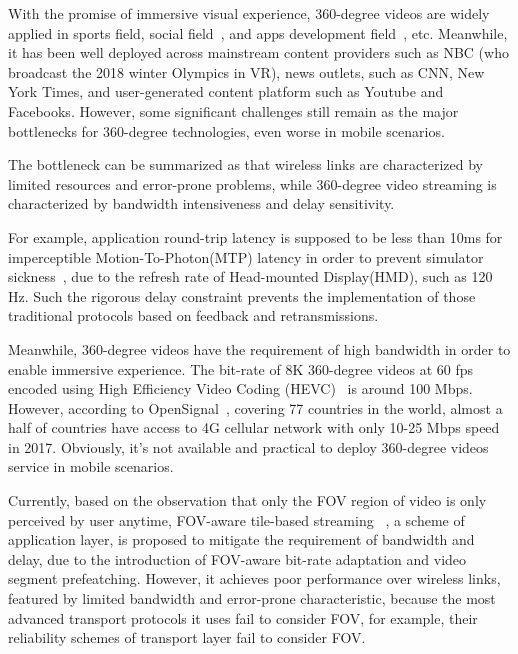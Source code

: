 With the promise of immersive visual experience, 360-degree videos are widely applied in sports field, social field~\cite{facebook360}, and apps development field~\cite{google_developers}, etc. Meanwhile, it has been well deployed across mainstream content providers such as NBC (who broadcast the 2018 winter Olympics in VR), news outlets, such as CNN, New York Times, and user-generated content platform such as Youtube and Facebooks.
However, some significant challenges still remain as the major bottlenecks for 360-degree technologies, even worse in mobile scenarios.

The bottleneck can be summarized as that wireless links are characterized by limited resources and error-prone problems, while 360-degree video streaming
is characterized by bandwidth intensiveness and delay sensitivity.

For example, application round-trip latency is supposed to be less than 10ms for imperceptible Motion-To-Photon(MTP) latency in order to prevent simulator sickness~\cite{Simulator_Sickness}, due to the refresh rate of Head-mounted Display(HMD), such as 120 Hz. Such the rigorous delay constraint prevents the implementation of those traditional protocols based on feedback and retransmissions.

Meanwhile, 360-degree videos have the requirement of high bandwidth in order to enable immersive experience. The bit-rate of 8K 360-degree videos at 60 fps encoded using High Efficiency Video Coding (HEVC)~\cite{HEVC} is around 100 Mbps. However, according to OpenSignal~\cite{opensignal}, covering 77 countries in the world, almost a half of countries have access to 4G cellular network with only 10-25 Mbps speed in 2017. Obviously, it's not available and practical to deploy 360-degree videos service in mobile scenarios.    

Currently, based on the observation that only the FOV region of video is only perceived by user anytime, FOV-aware tile-based streaming~\cite{Viewport-adaptive}\cite{360ProbDASH}\cite{Adaptive_Streaming_Framework} \cite{Two-tier}\cite{Omnidirectional_Video_over_HTTP}\cite{Furion}, a scheme of application layer, is proposed to mitigate the requirement of bandwidth and delay, due to the introduction of FOV-aware bit-rate adaptation and video segment prefeatching. However, it achieves poor performance over wireless links, featured by limited bandwidth and error-prone characteristic, because the most advanced transport protocols it uses fail to consider FOV, for example, their reliability schemes of transport layer fail to consider FOV.     

